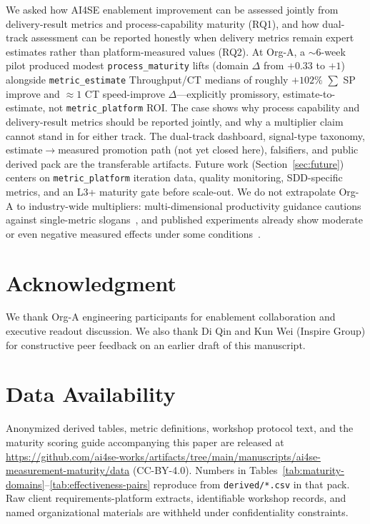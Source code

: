 \documentclass[10pt,conference]{IEEEtran}
\begin{document}
We asked how AI4SE enablement improvement can be assessed jointly from delivery-result metrics and process-capability maturity (RQ1), and how dual-track assessment can be reported honestly when delivery metrics remain expert estimates rather than platform-measured values (RQ2).
At Org-A, a $\sim$6-week pilot produced modest \texttt{process\_maturity} lifts (domain $\Delta$ from $+0.33$ to $+1$) alongside \texttt{metric\_estimate} Throughput/CT medians of roughly $+102\%$ $\sum$ SP improve and $\approx 1$ CT speed-improve $\Delta$---explicitly promissory, estimate-to-estimate, not \texttt{metric\_platform} ROI.
The case shows why process capability and delivery-result metrics should be reported jointly, and why a multiplier claim cannot stand in for either track.
The dual-track dashboard, signal-type taxonomy, estimate$\rightarrow$measured promotion path (not yet closed here), falsifiers, and public derived pack are the transferable artifacts.
Future work (Section~\ref{sec:future}) centers on \texttt{metric\_platform} iteration data, quality monitoring, SDD-specific metrics, and an L3+ maturity gate before scale-out.
We do not extrapolate Org-A to industry-wide multipliers: multi-dimensional productivity guidance cautions against single-metric slogans~\cite{Forsgren2021SPACE}, and published experiments already show moderate or even negative measured effects under some conditions~\cite{Cui2026GenAIField,METR2025AIProductivity}.

\section*{Acknowledgment}
We thank Org-A engineering participants for enablement collaboration and
executive readout discussion.
We also thank Di Qin and Kun Wei (Inspire Group) for constructive peer feedback
on an earlier draft of this manuscript.

\section*{Data Availability}
Anonymized derived tables, metric definitions, workshop protocol text, and the maturity scoring guide accompanying this paper are released at
\url{https://github.com/ai4se-works/artifacts/tree/main/manuscripts/ai4se-measurement-maturity/data}
(CC-BY-4.0).
Numbers in Tables~\ref{tab:maturity-domains}--\ref{tab:effectiveness-pairs} reproduce from \texttt{derived/*.csv} in that pack.
Raw client requirements-platform extracts, identifiable workshop records, and named organizational materials are withheld under confidentiality constraints.



\end{document}
